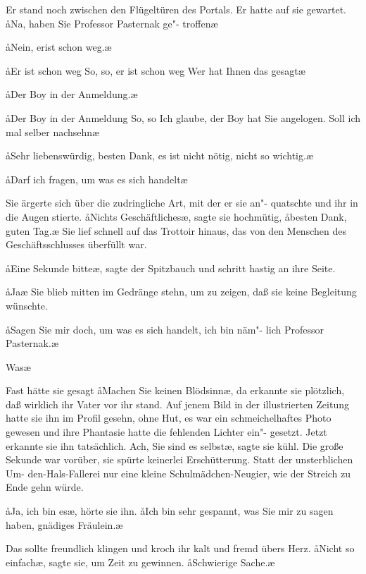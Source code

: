 Er stand noch zwischen den Flügeltüren des Portals. Er hatte
auf sie gewartet. \aa{}Na, haben Sie Professor Pasternak ge"-%
troffen\frag{}\ae{}

\aa{}Nein, erist schon weg.\ae{}

\aa{}Er ist schon weg\frag{} So, so, er ist schon weg\frag{} Wer hat Ihnen
das gesagt\frag{}\ae{}

\aa{}Der Boy in der Anmeldung.\ae{}

\aa{}Der Boy in der Anmeldung\frag{} So, so\frag{} Ich glaube, der Boy
hat Sie angelogen. Soll ich mal selber nachsehn\frag{}\ae{}

\aa{}Sehr liebenswürdig, besten Dank, es ist nicht nötig, nicht so
wichtig.\ae{}

\aa{}Darf ich fragen, um was es sich handelt\frag{}\ae{}

Sie ärgerte sich über die zudringliche Art, mit der er sie an"-%
quatschte und ihr in die Augen stierte. \aa{}Nichts Geschäftliches\ae{},\eingriff{eS69-1}{Geschäftliches\ae{}, ] Geschäftliches,\ae{}}
sagte sie hochmütig, \aa{}besten Dank, guten Tag.\ae{} Sie lief
schnell auf das Trottoir hinaus, das von den Menschen des
Geschäftsschlusses überfüllt war.

\aa{}Eine Sekunde bitte\ae{}, sagte der Spitzbauch und schritt hastig
an ihre Seite.

\aa{}Ja\frag{}\ae{} Sie blieb mitten im Gedränge stehn, um zu zeigen,
daß sie keine Begleitung wünschte.

\aa{}Sagen Sie mir doch, um was es sich handelt, ich bin näm"-%
lich Professor Pasternak.\ae{}

\aanah{}Was\frag{}\ae{}

Fast hätte sie gesagt\dopp{} \aa{}Machen Sie keinen Blödsinn\ae{}, da
erkannte sie plötzlich, daß wirklich ihr Vater vor ihr stand.
Auf jenem Bild in der illustrierten Zeitung hatte sie ihn im
Profil gesehn, ohne Hut, es war ein schmeichelhaftes Photo
gewesen und ihre Phantasie hatte die fehlenden Lichter ein"-%
gesetzt. Jetzt erkannte sie ihn tatsächlich. \aanah{}Ach, Sie sind es
selbst\frag{}\ae{}, sagte sie kühl. Die große Sekunde war vorüber, sie
spürte keinerlei Erschütterung. Statt der unsterblichen Um-%
den-Hals-Fallerei nur eine kleine Schulmädchen-Neugier, wie
der Streich zu Ende gehn würde.

\aa{}Ja, ich bin es\ae{}, hörte sie ihn. \aa{}Ich bin sehr gespannt, was
Sie mir zu sagen haben, gnädiges Fräulein.\ae{}

Das sollte freundlich klingen und kroch ihr kalt und fremd
übers Herz. \aa{}Nicht so einfach\ae{}, sagte sie, um Zeit zu gewinnen.
\aa{}Schwierige Sache.\ae{}

